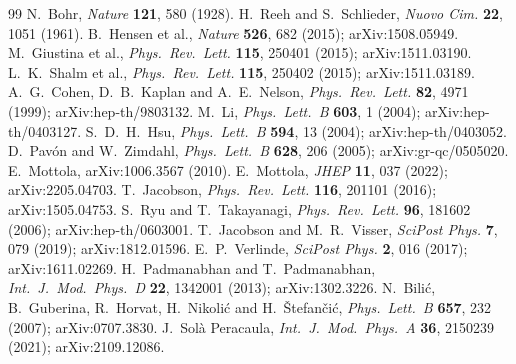 \documentclass[11pt,a4paper]{article}
\theoremstyle{plain}
\theoremstyle{definition}
\theoremstyle{remark}
\begin{document}
\begin{thebibliography}{99}
 N.~Bohr, \textit{Nature} \textbf{121}, 580 (1928).
 H.~Reeh and S.~Schlieder, \textit{Nuovo Cim.} \textbf{22}, 1051 (1961).
 B.~Hensen et al., \textit{Nature} \textbf{526}, 682 (2015); arXiv:1508.05949.
 M.~Giustina et al., \textit{Phys.\ Rev.\ Lett.} \textbf{115}, 250401 (2015); arXiv:1511.03190.
 L.~K.~Shalm et al., \textit{Phys.\ Rev.\ Lett.} \textbf{115}, 250402 (2015); arXiv:1511.03189.
 A.~G.~Cohen, D.~B.~Kaplan and A.~E.~Nelson, \textit{Phys.\ Rev.\ Lett.} \textbf{82}, 4971 (1999); arXiv:hep-th/9803132.
 M.~Li, \textit{Phys.\ Lett.\ B} \textbf{603}, 1 (2004); arXiv:hep-th/0403127.
 S.~D.~H.~Hsu, \textit{Phys.\ Lett.\ B} \textbf{594}, 13 (2004); arXiv:hep-th/0403052.
 D.~Pav\'on and W.~Zimdahl, \textit{Phys.\ Lett.\ B} \textbf{628}, 206 (2005); arXiv:gr-qc/0505020.
 E.~Mottola, arXiv:1006.3567 (2010).
 E.~Mottola, \textit{JHEP} \textbf{11}, 037 (2022); arXiv:2205.04703.
 T.~Jacobson, \textit{Phys.\ Rev.\ Lett.} \textbf{116}, 201101 (2016); arXiv:1505.04753.
 S.~Ryu and T.~Takayanagi, \textit{Phys.\ Rev.\ Lett.} \textbf{96}, 181602 (2006); arXiv:hep-th/0603001.
 T.~Jacobson and M.~R.~Visser, \textit{SciPost Phys.} \textbf{7}, 079 (2019); arXiv:1812.01596.
 E.~P.~Verlinde, \textit{SciPost Phys.} \textbf{2}, 016 (2017); arXiv:1611.02269.
 H.~Padmanabhan and T.~Padmanabhan, \textit{Int.\ J.\ Mod.\ Phys.\ D} \textbf{22}, 1342001 (2013); arXiv:1302.3226.
 N.~Bili\'c, B.~Guberina, R.~Horvat, H.~Nikoli\'c and H.~\v{S}tefan\v{c}i\'c, \textit{Phys.\ Lett.\ B} \textbf{657}, 232 (2007); arXiv:0707.3830.
 J.~Sol\`a Peracaula, \textit{Int.\ J.\ Mod.\ Phys.\ A} \textbf{36}, 2150239 (2021); arXiv:2109.12086.
\end{thebibliography}
\end{document}
